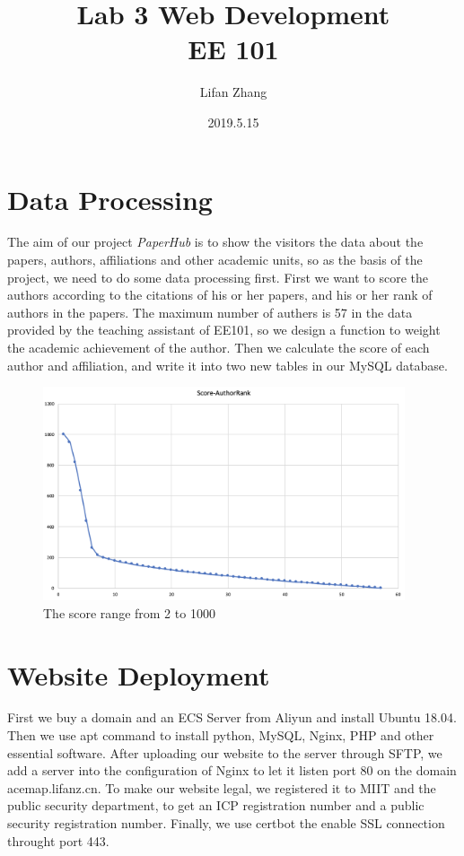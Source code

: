 \documentclass{article}
\title{Lab 3 Web Development \\ EE 101}
\author{Lifan Zhang}
\date{2019.5.15}
\begin{document}
\maketitle 

\section{Data Processing}
\hspace*{0.5cm}
The aim of our project \emph{PaperHub} is to show the visitors the data about the papers, authors, affiliations and
other academic units, so as the basis of the project, we need to do some data processing first. First we want to score
the authors according to the citations of his or her papers, and his or her rank of authors in the papers. The maximum 
number of authers is 57 in the data provided by the teaching assistant of EE101, so we design a function to weight the 
academic achievement of the author. Then we calculate the score of each author and affiliation, and write it into two
new tables in our MySQL database.

\begin{figure}[h]
\begin{center}
\includegraphics[width=0.95\textwidth]{zlf_1} %
\caption{The score range from 2 to 1000}
\end{center}
\end{figure}

\section{Website Deployment}
\hspace*{0.5cm}
First we buy a domain and an ECS Server from Aliyun and install Ubuntu 18.04. Then we use apt command to install python,
MySQL, Nginx, PHP and other essential software. After uploading our website to the server through SFTP, we add a server 
into the configuration of Nginx to let it listen port 80 on the domain acemap.lifanz.cn. To make our website legal, we 
registered it to MIIT and the public security department, to get an ICP registration number and a public security 
registration number. Finally, we use certbot the enable SSL connection throught port 443.
\end{document}
